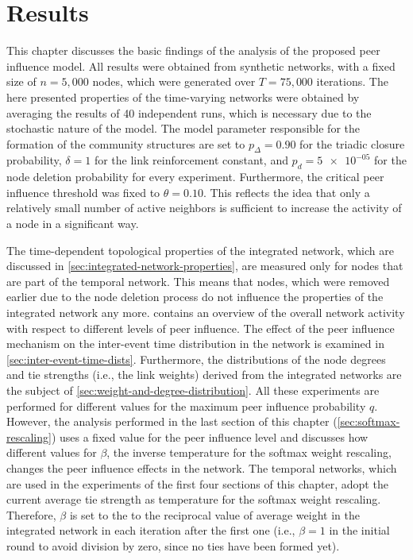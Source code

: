 \chapter{Results}
\label{cha:results}


This chapter discusses the basic findings of the analysis of the proposed peer influence model.
All results were obtained from synthetic networks, with a fixed size of \( n = 5,000 \) nodes, which were generated over \( T = 75,000 \) iterations.
The here presented properties of the time-varying networks were obtained by averaging the results of 40 independent runs, which is necessary due to the stochastic nature of the model.
The model parameter responsible for the formation of the community structures are set to \( p_{\Delta} = 0.90 \) for the triadic closure probability, \( \delta = 1 \) for the link reinforcement constant, and \( p_{d} = \num{5e-05} \) for the node deletion probability for every experiment.
Furthermore, the critical peer influence threshold was fixed to \( \theta = 0.10 \).
This reflects the idea that only a relatively small number of active neighbors is sufficient to increase the activity of a node in a significant way.

The time-dependent topological properties of the integrated network, which are discussed in \cref{sec:integrated-network-properties}, are measured only for nodes that are part of the temporal network.
This means that nodes, which were removed earlier due to the node deletion process do not influence the properties of the integrated network any more.
 contains an overview of the overall network activity with respect to different levels of peer influence.
The effect of the peer influence mechanism on the inter-event time distribution in the network is examined in \cref{sec:inter-event-time-dists}.
Furthermore, the distributions of the node degrees and tie strengths (i.e., the link weights) derived from the integrated networks are the subject of \cref{sec:weight-and-degree-distribution}.
All these experiments are performed for different values for the maximum peer influence probability \( q \).
However, the analysis performed in the last section of this chapter (\cref{sec:softmax-rescaling}) uses a fixed value for the peer influence level and discusses how different values for \( \beta \), the inverse temperature for the softmax weight rescaling, changes the peer influence effects in the network.
The temporal networks, which are used in the experiments of the first four sections of this chapter, adopt the current average tie strength as temperature for the softmax weight rescaling.
Therefore, \( \beta \) is set to the to the reciprocal value of average weight in the integrated network in each iteration after the first one (i.e., \( \beta = 1 \) in the initial round to avoid division by zero, since no ties have been formed yet).


